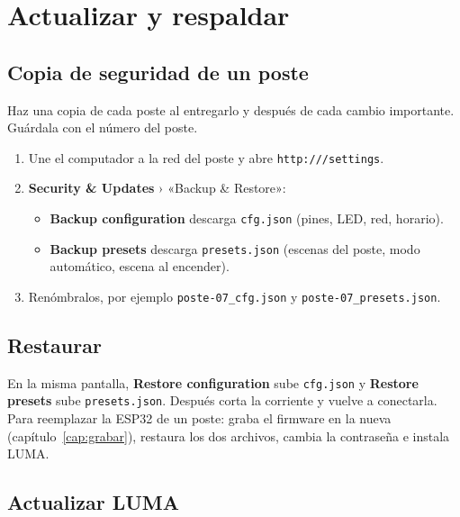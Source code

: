 \chapter{Actualizar y respaldar}\label{cap:actualizar}

\section{Copia de seguridad de un poste}

Haz una copia de cada poste al entregarlo y después de cada cambio importante. Guárdala con el número del poste.

\begin{enumerate}
\item Une el computador a la red del poste y abre \texttt{http:///settings}.
\item \textbf{Security \& Updates} › «Backup \& Restore»:
\begin{itemize}
\item \textbf{Backup configuration} descarga \texttt{cfg.json} (pines, LED, red, horario).
\item \textbf{Backup presets} descarga \texttt{presets.json} (escenas del poste, modo automático, escena al encender).
\end{itemize}
\item Renómbralos, por ejemplo \texttt{poste-07\_cfg.json} y \texttt{poste-07\_presets.json}.
\end{enumerate}


\section{Restaurar}

En la misma pantalla, \textbf{Restore configuration} sube \texttt{cfg.json} y \textbf{Restore presets} sube \texttt{presets.json}. Después corta la corriente y vuelve a conectarla. Para reemplazar la ESP32 de un poste: graba el firmware en la nueva (capítulo~\ref{cap:grabar}), restaura los dos archivos, cambia la contraseña e instala LUMA.

\section{Actualizar LUMA}

